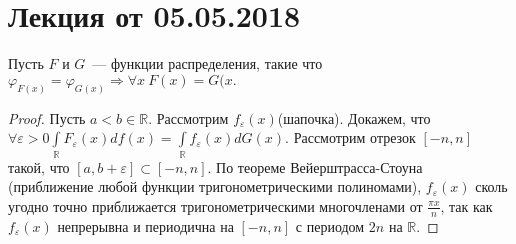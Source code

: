 \section{Лекция от 05.05.2018}
	\begin{theorem}[единственности]
		Пусть \(F\) и \(G\)~--- функции распределения, такие что \(\varphi_{F(x)} = \varphi_{G(x)} \Rightarrow \forall x~F(x) = G(x.\)
	\end{theorem}
	\begin{proof}
		Пусть \(a < b \in \mathbb{R}\). Рассмотрим \(f_\varepsilon(x)\)(шапочка). Докажем, что \(\forall \varepsilon > 0 \int\limits_{\mathbb{R}} F_\varepsilon(x) df(x) = \int\limits_\mathbb{R}f_\varepsilon(x)dG(x).\) Рассмотрим отрезок \([-n, n]\) такой, что \([a, b + \varepsilon] \subset [-n, n].\) По теореме Вейерштрасса-Стоуна (приближение любой функции тригонометрическими полиномами), \(f_\varepsilon(x)\) сколь угодно точно приближается тригонометрическими многочленами от \(\frac{\pi x}{n}\), так как \(f_\varepsilon(x)\) непрерывна и периодична на \([-n, n]\) с периодом \(2n\) на \(\mathbb{R}\).


\end{proof}
